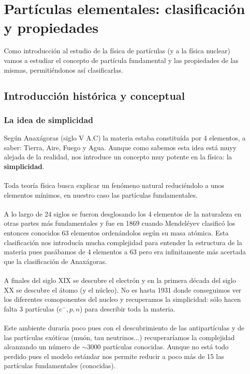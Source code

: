 \pagestyle{fancy}
\chapter{Partículas elementales: clasificación y propiedades}
Como introducción al estudio de la física de partículas (y a la física nuclear) vamos a estudiar el concepto de partícula fundamental y las propiedades de las mismas, permitiéndonos así clasificarlas.
\section{Introducción histórica y conceptual}
\subsection{La idea de simplicidad}
Según Anaxágoras (siglo V A.C) la materia estaba constituída por 4 elementos, a saber: Tierra, Aire, Fuego y Agua. Aunque como sabemos esta idea está muyy alejada de la realidad, nos introduce un concepto muy potente en la física: la \textbf{simplicidad}. \\\\
Toda teoría física busca explicar un fenómeno natural reduciéndolo a unos elementos mínimos, en nuestro caso las partículas fundamentales.\\\\
A lo largo de 24 siglos se fueron desglosando los 4 elementos de la naturaleza en otras partes más fundamentales y fue en 1869 cuando Mendeléyev clasificó los entonces conocidos 63 elementos ordenándolos según su masa atómica. Esta clasificación nos introducía mucha complejidad para entender la estructura de la materia pues pasábamos de 4 elementos a 63 pero era infinitamente más acertada que la clasificación de Anaxágoras.\\\\
A finales del siglo XIX se descubre el electrón y en la primera década del siglo XX se descubre el átomo (y el núcleo). No es hasta 1931 donde conseguimos ver los diferentes comoponentes del nucleo y recuperamos la simplicidad: sólo hacen falta 3 partículas ($e^-, p, n$) para describir toda la materia.\\\\ Este ambiente duraría poco pues con el descubrimiento de las antipartículas y de las partículas exóticas (muón, tau neutrinos...) recuperaríamos la complejidad alcanzando un número de $\sim 3000$ partículas conocidas. Aunque no está todo perdido pues el modelo estándar nos permite reducir a poco más de 15 las partículas fundamentales (conocidas).
